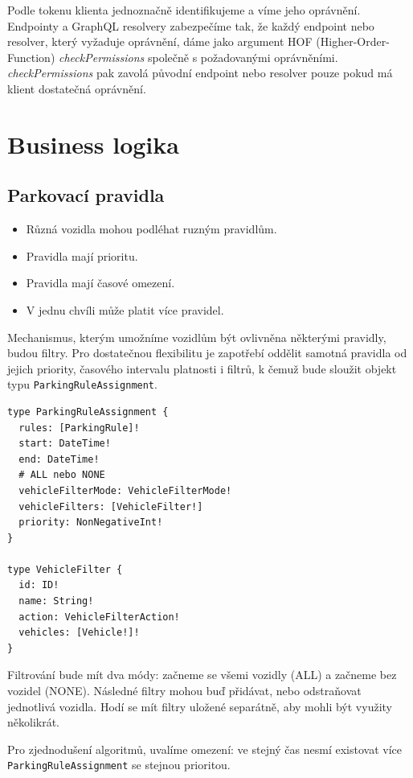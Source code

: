Podle tokenu klienta jednoznačně identifikujeme a víme jeho oprávnění. Endpointy a GraphQL resolvery zabezpečíme tak,
že každý endpoint nebo resolver, který vyžaduje oprávnění, dáme jako argument HOF (Higher-Order-Function)
\textit{checkPermissions} společně s požadovanými oprávněními. \textit{checkPermissions} pak zavolá původní endpoint
nebo resolver pouze pokud má klient dostatečná oprávnění.

\section{Business logika}

\subsection{Parkovací pravidla} \label{analysis_parking_schema}

\begin{itemize}
  \item Různá vozidla mohou podléhat ruzným pravidlům.
  \item Pravidla mají prioritu.
  \item Pravidla mají časové omezení.
  \item V jednu chvíli může platit více pravidel.
\end{itemize}

Mechanismus, kterým umožníme vozidlům být ovlivněna některými pravidly,
budou filtry.
Pro dostatečnou flexibilitu je zapotřebí oddělit samotná pravidla od jejich
priority, časového intervalu platnosti i filtrů,
k čemuž bude sloužit objekt typu \texttt{ParkingRuleAssignment}.

\begin{lstlisting}
type ParkingRuleAssignment {
  rules: [ParkingRule]!
  start: DateTime!
  end: DateTime!
  # ALL nebo NONE
  vehicleFilterMode: VehicleFilterMode!
  vehicleFilters: [VehicleFilter!]
  priority: NonNegativeInt!
}

type VehicleFilter {
  id: ID!
  name: String!
  action: VehicleFilterAction!
  vehicles: [Vehicle!]!
}
\end{lstlisting}

Filtrování bude mít dva módy: začneme se všemi vozidly (ALL) a začneme bez vozidel (NONE).
Následné filtry mohou buď přidávat, nebo odstraňovat jednotlivá vozidla.
Hodí se mít filtry uložené separátně, aby mohli být využity několikrát.

Pro zjednodušení algoritmů, uvalíme omezení: ve stejný čas nesmí existovat více \texttt{ParkingRuleAssignment}
se stejnou prioritou.

